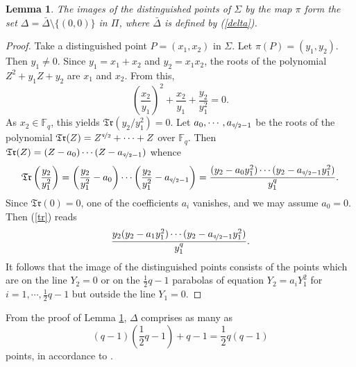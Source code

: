 \documentclass[sn-mathphys-num]{sn-jnl}%
\newtheorem{lemma}{Lemma}%
\begin{document}
 \begin{lemma}\label{image}
     The images of the distinguished points of $\Sigma$ by the map $\pi$ form the set $\Delta=\bar{\Delta}\setminus\{(0,0)\}$ in $\Pi$, where $\bar{\Delta}$ is defined by (\ref{delta}).
 \end{lemma}
 \begin{proof}
Take a distinguished point $P=(x_1,x_2)$ in $\Sigma$. Let $\pi(P)=(y_1,y_2)$. Then $y_1\ne 0$. Since $y_1=x_1+x_2$ and $y_2=x_1x_2$, the roots of the polynomial $Z^2+y_1Z+y_2$ are $x_1$ and $x_2$. From this,  
     \begin{equation*}\label{eq}
             \left(\frac{x_2}{y_1}\right)^2+\frac{x_2}{y_1}+\frac{y_2}{y_1^2}=0.
         \end{equation*}
    As $x_2\in\mathbb{F}_q$, this yields $\mathfrak{Tr}(y_2/y_1^2)=0$. Let $a_0,\cdots,a_{\nicefrac{q}{2}-1}$ be the roots of the polynomial $\mathfrak{Tr}(Z)=Z^{\nicefrac{q}{2}}+\cdots+Z$ over $\mathbb{F}_q$. Then $\mathfrak{Tr}(Z)=(Z-a_0)\cdots(Z-a_{\nicefrac{q}{2}-1})$ whence
     \begin{equation}\label{tr}
         \mathfrak{Tr}\left(\frac{y_2}{y_1^2}\right)=\left(\frac{y_2}{y_1^2}-a_0\right)\cdots\left(\frac{y_2}{y_1^2}-a_{\nicefrac{q}{2}-1}\right)=\frac{(y_2-a_0y_1^2)\cdots(y_2-a_{\nicefrac{q}{2}-1}y_1^2)}{y_1^q}.
     \end{equation}
    Since $\mathfrak{Tr}(0)=0$, one of the coefficients $a_i$ vanishes, and we may assume $a_0=0$. Then (\ref{tr}) reads
    \begin{equation*}
        \frac{y_2(y_2-a_1y_1^2)\cdots(y_2-a_{\nicefrac{q}{2}-1}y_1^2)}{y_1^q}.
    \end{equation*}
It follows that the image of the distinguished points consists of the points which are on the line $Y_2=0$ or on the $\frac{1}{2}q-1$ parabolas of equation $Y_2=a_iY_1^2$ for $i=1,\cdots,\frac{1}{2}q-1$ but outside the line $Y_1=0$.
     \end{proof}

From the proof of Lemma \ref{image}, $\Delta$ comprises as many as $$(q-1)\left(\textstyle{\frac{1}{2}}q-1\right)+q-1=\textstyle{\frac{1}{2}}q(q-1)$$ points, in accordance to \cite{datta2023codes}.
\end{document}
